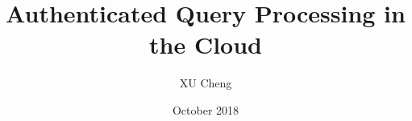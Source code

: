 \documentclass[12pt]{book}
\title{Authenticated Query Processing in the Cloud}
\author{XU Cheng}
\date{October 2018}
\begin{document}
\maketitle%

\frontmatter%

\declaration%
%
%
\tableofcontents%
\listoffigures%
\listoftables%

\mainmatter%

%

\backmatter%

%
\end{document}
